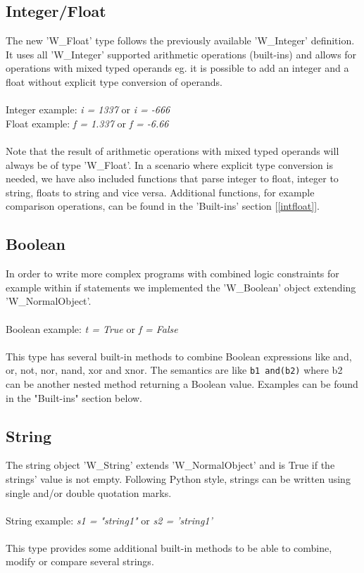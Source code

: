 \documentclass{article}
\begin{document}
\subsection{Integer/Float}
The new 'W\_Float' type follows the previously available 'W\_Integer' definition. It uses all 'W\_Integer' supported arithmetic operations (built-ins) and allows for operations with mixed typed operands eg. it is possible to add an integer and a float without explicit type conversion of operands. \\
\\ Integer example: \textit{i = 1337} or \textit{i = -666} 
\\ Float example: \textit{f = 1.337} or \textit{f = -6.66} \\\\
Note that the result of arithmetic operations with mixed typed operands will always be of type 'W\_Float'. In a scenario where explicit type conversion is needed, we have also included functions that parse integer to float, integer to string, floats to string and vice versa. Additional functions, for example comparison operations, can be found in the 'Built-ins' section [\ref{intfloat}].

\subsection{Boolean}
In order to write more complex programs with combined logic constraints for example within if statements we implemented the 'W\_Boolean' object extending 'W\_NormalObject'.\\
\\ Boolean example: \textit{t = True} or \textit{f = False} \\\\
This type has several built-in methods to combine Boolean expressions like and, or, not, nor, nand, xor and xnor.
The semantics are like \texttt{b1 and(b2)} where b2 can be another nested method returning a Boolean value. Examples can be found in the "Built-ins" section below.


\subsection{String}
The string object 'W\_String' extends 'W\_NormalObject' and is True if the strings' value is not empty. Following Python style, strings can be written using single and/or double quotation marks.\\
\\ String example: \textit{s1 = "string1"} or \textit{s2 = 'string1'} \\\\
This type provides some additional built-in methods to be able to combine, modify or compare several strings.
\end{document}

